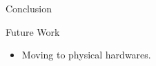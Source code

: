 \begin{frame}{Conclusion}
    \begin{block}{Future Work}
        \begin{itemize}
            \item Moving to physical hardwares.
        \end{itemize}
    \end{block}
\end{frame}